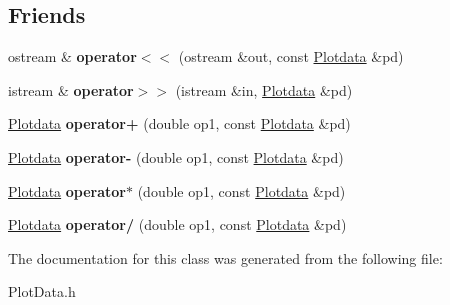 \subsection*{Friends}
\begin{DoxyCompactItemize}
\item 
ostream \& {\bfseries operator$<$$<$} (ostream \&out, const \hyperlink{class_plotdata}{Plotdata} \&pd)\hypertarget{class_plotdata_a8b3c8f1df5d16263ea6a94ad32d6b536}{}\label{class_plotdata_a8b3c8f1df5d16263ea6a94ad32d6b536}

\item 
istream \& {\bfseries operator$>$$>$} (istream \&in, \hyperlink{class_plotdata}{Plotdata} \&pd)\hypertarget{class_plotdata_a0ab22894d528383ee7cf7a6738196e0f}{}\label{class_plotdata_a0ab22894d528383ee7cf7a6738196e0f}

\item 
\hyperlink{class_plotdata}{Plotdata} {\bfseries operator+} (double op1, const \hyperlink{class_plotdata}{Plotdata} \&pd)\hypertarget{class_plotdata_aaf2f800960b2fd6d8478fc55951473dd}{}\label{class_plotdata_aaf2f800960b2fd6d8478fc55951473dd}

\item 
\hyperlink{class_plotdata}{Plotdata} {\bfseries operator-\/} (double op1, const \hyperlink{class_plotdata}{Plotdata} \&pd)\hypertarget{class_plotdata_a6d4f54731ca0b016f347791a6df53ac3}{}\label{class_plotdata_a6d4f54731ca0b016f347791a6df53ac3}

\item 
\hyperlink{class_plotdata}{Plotdata} {\bfseries operator$\ast$} (double op1, const \hyperlink{class_plotdata}{Plotdata} \&pd)\hypertarget{class_plotdata_a86cdc60f10cda6c0f871b2134856dbac}{}\label{class_plotdata_a86cdc60f10cda6c0f871b2134856dbac}

\item 
\hyperlink{class_plotdata}{Plotdata} {\bfseries operator/} (double op1, const \hyperlink{class_plotdata}{Plotdata} \&pd)\hypertarget{class_plotdata_a77ca87461fb382386a69c8dbbad4b799}{}\label{class_plotdata_a77ca87461fb382386a69c8dbbad4b799}

\end{DoxyCompactItemize}


The documentation for this class was generated from the following file\+:\begin{DoxyCompactItemize}
\item 
Plot\+Data.\+h\end{DoxyCompactItemize}
